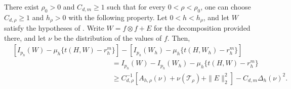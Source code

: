 \begin{lemma}
\label{lem:graphon-lagrangian-bound}
There exist $\rho_0>0$ and $C_{d,m}\ge1$ such that for
every $0<\rho<\rho_0$, one can choose $C_{d,\rho}\ge1$ and $h_\rho>0$ with
the following property.  Let $0<h<h_\rho$, and let $W$ satisfy the hypotheses of
.  Write $W=f\otimes f+E$ for the
decomposition provided there, and let $\nu$ be the distribution of the
values of $f$.  Then,
\begin{equation}\label{eq:graphon-lagrangian-bound}
\begin{aligned}
  &\left[I_{p_h}(W)-\mu_h\{t(H,W)-r_h^m\}\right]
   -\left[I_{p_h}(W_h)-\mu_h\{t(H,W_h)-r_h^m\}\right]\\
  &\qquad\qquad\qquad\qquad\qquad\qquad\qquad=I_{p_h}(W)-I_{p_h}(W_h)-\mu_h\{t(H,W)-r_h^m\}\\
  &\qquad\qquad\qquad\qquad\qquad\qquad\qquad
  \ge C_{d,\rho}^{-1}\!\left[A_{h,\rho}(\nu)+\nu(\mathcal T_\rho)+\|E\|_2^2\right]
  -C_{d,m}\Delta_h(\nu)^2.
\end{aligned}
\end{equation}
\end{lemma}

